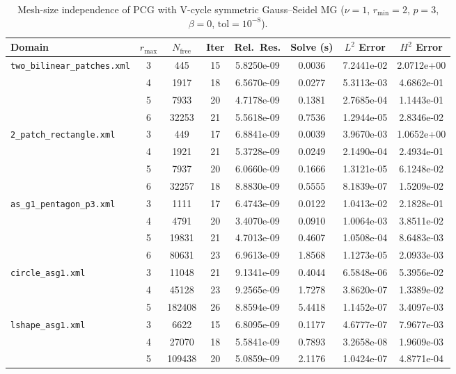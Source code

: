 \documentclass[11pt,a4paper]{article}
\begin{document}
\begin{table}[htbp]
\centering
\caption{Mesh-size independence of PCG with V-cycle symmetric Gauss--Seidel MG ($\nu=1$, $r_{\min}=2$, $p=3$, $\beta=0$, $\mathrm{tol}=10^{-8}$).}
\label{tab:h_indep}
\small
\begin{tabular}{lccccccc}
\toprule
Domain & $r_{\max}$ & $N_{\mathrm{free}}$ & Iter & Rel.\ Res. & Solve (s) & $L^2$ Error & $H^2$ Error \\
\midrule
\multirow{4}{*}{\texttt{two\_bilinear\_patches.xml}}
 & 3 & 445   & 15 & 5.8250e-09 & 0.0036 & 7.2441e-02 & 2.0712e+00 \\
 & 4 & 1917  & 18 & 6.5670e-09 & 0.0277 & 5.3113e-03 & 4.6862e-01 \\
 & 5 & 7933  & 20 & 4.7178e-09 & 0.1381 & 2.7685e-04 & 1.1443e-01 \\
 & 6 & 32253 & 21 & 5.5618e-09 & 0.7536 & 1.2944e-05 & 2.8346e-02 \\
\midrule
\multirow{4}{*}{\texttt{2\_patch\_rectangle.xml}}
 & 3 & 449   & 17 & 6.8841e-09 & 0.0039 & 3.9670e-03 & 1.0652e+00 \\
 & 4 & 1921  & 21 & 5.3728e-09 & 0.0249 & 2.1490e-04 & 2.4934e-01 \\
 & 5 & 7937  & 20 & 6.0660e-09 & 0.1666 & 1.3121e-05 & 6.1248e-02 \\
 & 6 & 32257 & 18 & 8.8830e-09 & 0.5555 & 8.1839e-07 & 1.5209e-02 \\
\midrule
\multirow{4}{*}{\texttt{as\_g1\_pentagon\_p3.xml}}
 & 3 & 1111  & 17 & 6.4743e-09 & 0.0122 & 1.0413e-02 & 2.1828e-01 \\
 & 4 & 4791  & 20 & 3.4070e-09 & 0.0910 & 1.0064e-03 & 3.8511e-02 \\
 & 5 & 19831 & 21 & 4.7013e-09 & 0.4607 & 1.0508e-04 & 8.6483e-03 \\
 & 6 & 80631 & 23 & 6.9613e-09 & 1.8568 & 1.1273e-05 & 2.0933e-03 \\
\midrule
\multirow{3}{*}{\texttt{circle\_asg1.xml}}
 & 3 & 11048  & 21 & 9.1341e-09 & 0.4044 & 6.5848e-06 & 5.3956e-02 \\
 & 4 & 45128  & 23 & 9.2565e-09 & 1.7278 & 3.8620e-07 & 1.3389e-02 \\
 & 5 & 182408 & 26 & 8.8594e-09 & 5.4418 & 1.1452e-07 & 3.4097e-03 \\
\midrule
\multirow{3}{*}{\texttt{lshape\_asg1.xml}}
 & 3 & 6622   & 15 & 6.8095e-09 & 0.1177 & 4.6777e-07 & 7.9677e-03 \\
 & 4 & 27070  & 18 & 5.5841e-09 & 0.7893 & 3.2658e-08 & 1.9609e-03 \\
 & 5 & 109438 & 20 & 5.0859e-09 & 2.1176 & 1.0424e-07 & 4.8771e-04 \\
\bottomrule
\end{tabular}
\end{table}
\end{document}

